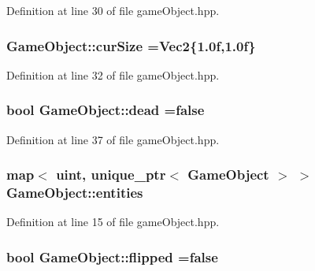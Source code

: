 Definition at line 30 of file game\-Object.\-hpp.

\hypertarget{class_game_object_abe62d110f8637e110d8134283ed7b005}{
\subsubsection[{cur\-Size}]{ Game\-Object\-::cur\-Size ={\bf Vec2}\{1.\-0f,1.\-0f\}}}\label{class_game_object_abe62d110f8637e110d8134283ed7b005}


Definition at line 32 of file game\-Object.\-hpp.

\hypertarget{class_game_object_a69b2c28686d4cce93cf49fa7a8a5cb88}{
\subsubsection[{dead}]{\setlength{\rightskip}{0pt plus 5cm}bool Game\-Object\-::dead =false}}\label{class_game_object_a69b2c28686d4cce93cf49fa7a8a5cb88}


Definition at line 37 of file game\-Object.\-hpp.

\hypertarget{class_game_object_a10fad154fed185ee6fc1d3b529288e32}{
\subsubsection[{entities}]{\setlength{\rightskip}{0pt plus 5cm}map$<$ {\bf uint}, unique\-\_\-ptr$<$ {\bf Game\-Object} $>$ $>$ Game\-Object\-::entities\hspace{0.3cm}{\ttfamily [static]}}}\label{class_game_object_a10fad154fed185ee6fc1d3b529288e32}


Definition at line 15 of file game\-Object.\-hpp.

\hypertarget{class_game_object_a2434229e5fe5896e3fe2a06bd30b4189}{
\subsubsection[{flipped}]{\setlength{\rightskip}{0pt plus 5cm}bool Game\-Object\-::flipped =false}}\label{class_game_object_a2434229e5fe5896e3fe2a06bd30b4189}


